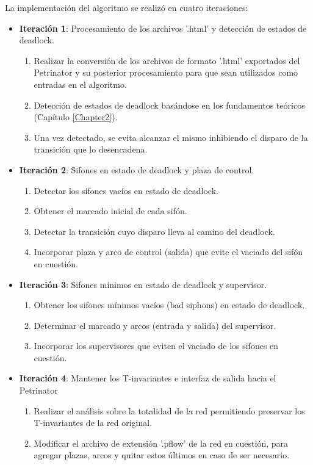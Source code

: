 \par \noindent La implementación del algoritmo se realizó en cuatro iteraciones:
\begin{itemize}
    \item \textbf{Iteración 1}: Procesamiento de los archivos '.html' y detección de estados de deadlock.
    \begin{enumerate}
        \item Realizar la conversión de los archivos de formato '.html' exportados del Petrinator y su posterior procesamiento para que sean utilizados como entradas en el algoritmo.
        \item Detección de estados de deadlock basándose en los fundamentos teóricos (Capítulo \ref{Chapter2}).
        \item Una vez detectado, se evita alcanzar el mismo inhibiendo el disparo de la transición que lo desencadena.
    \end{enumerate}
    
    \item \textbf{Iteración 2}: Sifones en estado de deadlock y plaza de control.
    \begin{enumerate}
        \item Detectar los sifones vacíos en estado de deadlock.  
        \item Obtener el marcado inicial de cada sifón.
        \item Detectar la transición cuyo disparo lleva al camino del deadlock.
        \item Incorporar plaza y arco de control (salida) que evite el vaciado del sifón en cuestión.
    \end{enumerate}
    
    \item \textbf{Iteración 3}: Sifones mínimos en estado de deadlock y supervisor.
    \begin{enumerate}
        \item Obtener los sifones mínimos vacíos (bad siphons) en estado de deadlock.
        \item Determinar el marcado y arcos (entrada y salida) del supervisor.
        \item Incorporar los supervisores que eviten el vaciado de los sifones en cuestión.
    \end{enumerate}
    
    \item \textbf{Iteración 4}: Mantener los T-invariantes e interfaz de salida hacia el Petrinator
    \begin{enumerate}
        \item Realizar el análisis sobre la totalidad de la red permitiendo preservar los T-invariantes de la red original.
        \item Modificar el archivo de extensión '.pflow' de la red en cuestión, para agregar plazas, arcos y quitar estos últimos en caso de ser necesario.
    \end{enumerate}
\end{itemize}

